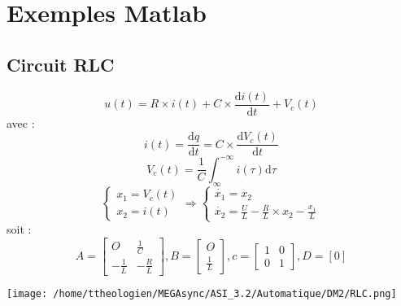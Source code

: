 \documentclass[a4paper,12pt]{article}
\begin{document}
  \section{Exemples Matlab}
  \label{sec:Exemples Matlab}

    \subsection{Circuit RLC}
    \label{sub:Circuit RLC}
    \[u(t) = R \times i(t) + C \times \frac{\mathrm{d}i(t)}{\mathrm{d}t} + V_c(t)\]
    avec :
    \[i(t) = \frac{\mathrm{d}q}{\mathrm{d}t} = C \times \frac{\mathrm{d}V_c(t)}{\mathrm{d}t}\]
    \[V_c(t) = \frac{1}{C} \int_{\infty}^{-\infty}i(\tau)\mathrm{d}\tau\]
    \[\left\{
              \begin{array}{ll}
                x_1 = V_c(t)\\
                x_2 = i(t)
              \end{array}
      \right.
      \Rightarrow
      \left\{
              \begin{array}{ll}
                \dot{x_1} = x_2\\
                \dot{x_2} = \frac{U}{L} - \frac{R}{L} \times x_2 - \frac{x_1}{L}
              \end{array}
      \right.
      \]
    soit :
    \[ A = \left[
                  \begin{array}{cc}
                    O             & \frac{1}{C}\\
                    -\frac{1}{L}  & -\frac{R}{L}
                  \end{array}
            \right],
        B = \left[
                  \begin{array}{c}
                    O\\
                    \frac{1}{L}
                  \end{array}
            \right],
        c = \left[
                  \begin{array}{cc}
                    1 & 0\\
                    0 & 1
                  \end{array}
            \right],
        D = [0]
    \]

    \begin{center}
      \texttt{[image: /home/ttheologien/MEGAsync/ASI\_3.2/Automatique/DM2/RLC.png]}
    \end{center}

    \newpage
\end{document}
